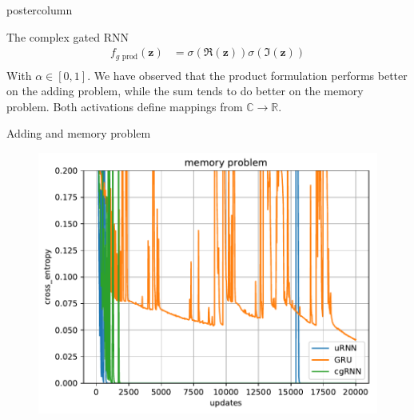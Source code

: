 \documentclass{beamer}
\newcommand{\bm}{\mathbf}
\newcommand{\bz}{\bm{z}}
\begin{document}
\begin{frame}
\begin{columns}
\begin{column}{.57\textwidth}
\begin{beamercolorbox}[center]{postercolumn}
\begin{minipage}{.98\textwidth}
{\begin{myblock}{The complex gated RNN}
\begin{align}
                            f_{g\text{ prod}}(\bz) &= \sigma(\Re(\bz)) \sigma(\Im(\bz)) \\
                        \end{align}
                        With $\alpha \in [0, 1]$. We have observed that the product formulation performs better on the adding problem, while the sum tends to do better on the memory problem. Both activations define mappings from $\mathbb{C} \rightarrow \mathbb{R}$.

                    \end{myblock}\vfill
                    \begin{myblock}{Adding and memory problem}
                        \begin{figure}
                            \begin{minipage}{0.43\textwidth}
                                \centering\includegraphics{img/icvss_memory.pdf}
                            \end{minipage}
                            \hspace{1em}
                            \begin{minipage}{0.45\textwidth}

\end{minipage}
\end{figure}
\end{myblock}}
\end{minipage}
\end{beamercolorbox}
\end{column}
\end{columns}
\end{frame}
\end{document}
